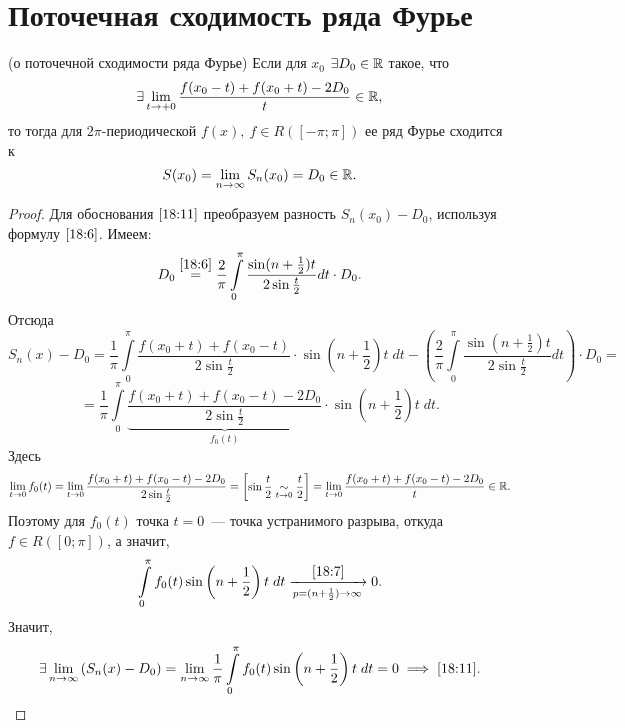 \documentclass[../../main.tex]{subfiles}
\begin{document}
\section{Поточечная сходимость ряда Фурье}
\begin{thm}(о поточечной сходимости ряда Фурье)
	Если для $x_0$ $\exists D_0 \in \mathbb{R}$ такое, что
	\[\exists \lim\limits_{t \rightarrow +0}{\dfrac
		{f(x_0 - t) + f(x_0 + t) - 2D_0}{t}} \in \mathbb{R},\] то тогда для
	$2\pi$-периодической $f(x),\ f \in R([-\pi; \pi])$ ее ряд Фурье
	сходится к
	\begin{equation}
		\label{18:11}
		S(x_0) = \lim\limits_{n \rightarrow \infty}S_n(x_0) = D_0 \in \mathbb{R}.
	\end{equation}
\end{thm}
\begin{proof}
	Для обоснования $\eqref{18:11}$ преобразуем разность 
	$S_n(x_0) - D_0$, используя формулу $\eqref{18:6}$. Имеем:
	\[D_0 \stackrel{\eqref{18:6}}{=} \dfrac{2}{\pi}
	\int\limits_{0}^{\pi}{\dfrac{\sin(n+\frac{1}{2})t}{2\sin\frac{t}{2}}
	dt} \cdot D_0.\]
	Отсюда
	\[S_n(x) - D_0 = \dfrac{1}{\pi}\int\limits_{0}^{\pi}
	{\dfrac{f(x_0 + t) + f(x_0 - t)}{2\sin\frac{t}{2}}} \cdot 
	\sin\left(n + \frac{1}{2}\right)t\;dt - \left(\dfrac{2}{\pi}\int\limits_{0}^{\pi}
	\dfrac{\sin(n + \frac{1}{2})t}{2\sin\frac{t}{2}}dt\right)\cdot D_0 =\]
	\[= \dfrac{1}{\pi}\int\limits_{0}^{\pi}{\underbrace{\frac{f(x_0 + t) +
		f(x_0 - t) - 2D_0}{2\sin\frac{t}{2}}}_{f_0(t)}}\cdot\sin\left(n + \dfrac{1}{2}\right)t\;dt.\]
	Здесь
	\[\lim\limits_{t \rightarrow 0}{f_0(t)} = 
	\lim\limits_{t \rightarrow 0}{\dfrac{f(x_0 + t) + f(x_0 - t) - 2D_0}
		{2\sin\frac{t}{2}}} =
	\left[ 
	\begin{gathered} 
	\sin\dfrac{t}{2} \underset {t \rightarrow 0}{\sim} \dfrac{t}{2} 
	\end{gathered} 
	\right]  =
	\lim\limits_{t \rightarrow 0}{\dfrac{f(x_0 + t) + f(x_0 - t)-
		2D_0}t} \in \mathbb{R}.\]
	Поэтому для $f_0(t)$ точка $t = 0$~--- точка устранимого разрыва, откуда
	$f \in R([0; \pi])$, а значит,
	\[\int\limits_{0}^{\pi}{f_0(t)\sin\left(n+\dfrac{1}{2}\right)t\;dt} 
	\stk{18:7}{\appr
		{p=(n+\frac{1}{2}) \rightarrow \infty}} 0.\]
	Значит, \[\exists \lim\limits_{n \rightarrow \infty}{(
		S_n(x) - D_0)} = \lim\limits_{n\rightarrow \infty}
	{\dfrac{1}{\pi}}\int\limits_{0}^{\pi}{f_0(t)\sin\left(n+\dfrac{1}{2}\right)t\;dt} = 0
	\implies \eqref{18:11}. \qedhere\]
\end{proof}
\end{document}
